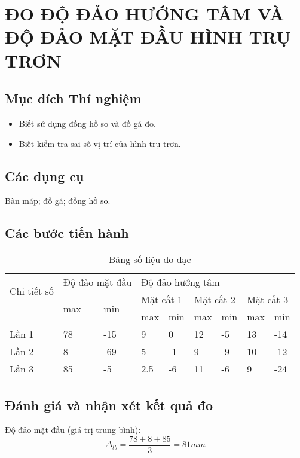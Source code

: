 \chapter{ĐO ĐỘ ĐẢO HƯỚNG TÂM VÀ ĐỘ ĐẢO MẶT ĐẦU HÌNH TRỤ TRƠN}

\section{Mục đích Thí nghiệm}
\begin{itemize}
	\item Biết sử dụng đồng hồ so và đồ gá đo.
	\item Biết kiểm tra sai số vị trí của hình trụ trơn.
\end{itemize}

\section{Các dụng cụ}
Bàn máp; đồ gá; đồng hồ so.

\section{Các bước tiến hành}

\begin{table}[ht]
	\centering
	\caption{Bảng số liệu đo đạc}
	\begin{tabular}{lllllllll}\toprule
		\multirow{2}{*}{Chi tiết số} & \multicolumn{2}{l}{Độ đảo mặt đầu} & \multicolumn{6}{l}{Độ đảo hướng tâm}\\\cmidrule(r{4pt}){2-3} \cmidrule(l){4-9}
		& \multirow{2}{*}{max} & \multirow{2}{*}{min} & \multicolumn{2}{l}{Mặt cắt 1} & \multicolumn{2}{l}{Mặt cắt 2} & \multicolumn{2}{l}{Mặt cắt 3}\\ \cmidrule(r{4pt}){4-5} \cmidrule(r{4pt}){6-7} \cmidrule(r{4pt}){8-9}
		& & & max & min & max & min & max & min\\\midrule
		Lần 1 & 78 & -15 & 9 & 0 & 12 & -5 & 13 & -14\\
		Lần 2 & 8 & -69 & 5 & -1 & 9 & -9 & 10 & -12\\
		Lần 3 & 85 & -5 & 2.5 & -6 & 11 & -6 & 9 & -24\\\bottomrule
	\end{tabular}
\end{table}

\section{Đánh giá và nhận xét kết quả đo}
Độ đảo mặt đầu (giá trị trung bình):
\[
\Delta_{tb} = \dfrac{78+8+85}{3} = 81\unit{mm}
\]

